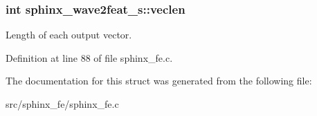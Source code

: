 \subsubsection[{veclen}]{\setlength{\rightskip}{0pt plus 5cm}int {\bf sphinx\-\_\-wave2feat\-\_\-s\-::veclen}}\label{structsphinx__wave2feat__s_ad71e5fca7c13ae0258bcee81a6f1fa89}


\-Length of each output vector. 



\-Definition at line 88 of file sphinx\-\_\-fe.\-c.



\-The documentation for this struct was generated from the following file\-:\begin{DoxyCompactItemize}
\item 
src/sphinx\-\_\-fe/sphinx\-\_\-fe.\-c\end{DoxyCompactItemize}
